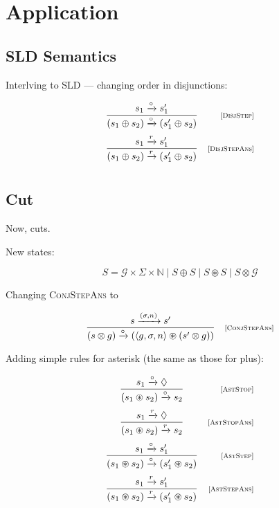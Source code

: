 \section{Application}

\subsection{SLD Semantics}

Interlving to SLD --- changing order in disjunctions:

\[
  \begin{array}{cr}
    \dfrac{s_1 \xrightarrow{\circ} s'_1}{(s_1 \oplus s_2) \xrightarrow{\circ} (s'_1 \oplus s_2)} &\mbox{\scriptsize{[\textsc{DisjStep}]}}\\[5mm]
    \dfrac{s_1 \xrightarrow{r} s'_1}{(s_1 \oplus s_2) \xrightarrow{r} (s'_1 \oplus s_2)} &\mbox{\scriptsize{[\textsc{DisjStepAns}]}}\\[5mm]
  \end{array}
\]

\subsection{Cut}

Now, cuts.

New states:

\[
S = \mathcal{G}\times\Sigma\times\mathbb{N}\mid S\oplus S \mid  S \circledast S \mid S \otimes \mathcal{G}
\]


Changing \textsc{ConjStepAns} to

  \[
  \begin{array}{cr}
    \dfrac{s \xrightarrow{(\sigma, n)} s'}{(s \otimes g) \xrightarrow{\circ} (\left<{g, \sigma, n}\right> \circledast (s' \otimes g))} & \mbox{\scriptsize{[\textsc{ConjStepAns}]}} 
  \end{array}
  \]
  
Adding simple rules for asterisk (the same as those for plus):

  \[
  \begin{array}{cr}
    \dfrac{s_1 \xrightarrow{\circ} \Diamond}{(s_1 \circledast s_2) \xrightarrow{\circ} s_2} & \mbox{\scriptsize{[\textsc{AstStop}]}}\\[5mm]
    \dfrac{s_1 \xrightarrow{r} \Diamond}{(s_1 \circledast s_2) \xrightarrow{r} s_2} & \mbox{\scriptsize{[\textsc{AstStopAns}]}}\\[5mm]
    \dfrac{s_1 \xrightarrow{\circ} s'_1}{(s_1 \circledast s_2) \xrightarrow{\circ} (s'_1 \circledast s_2)} &\mbox{\scriptsize{[\textsc{AstStep}]}}\\[5mm]
    \dfrac{s_1 \xrightarrow{r} s'_1}{(s_1 \circledast s_2) \xrightarrow{r} (s'_1 \circledast s_2)} &\mbox{\scriptsize{[\textsc{AstStepAns}]}}\\[5mm]
  \end{array}
\]
  
